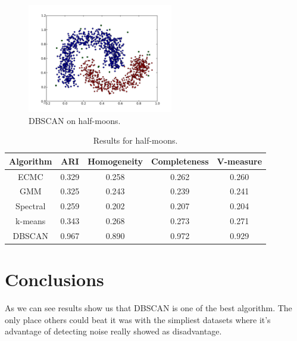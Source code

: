 \documentclass[conference]{IEEEtran}
\begin{document}
\begin{figure}[th]
\centering
\includegraphics[width=15pc]{dbscan_half-moons.pdf}
\caption{DBSCAN on half-moons.}
\label{DBSCAN_halfmoons}
\end{figure}

\begin{table}[htbp]
\caption{Results for half-moons.}
\label{halfmoonsresults}
\begin{center}
\setlength{\tabcolsep}{3pt}
\begin{tabular}{ |c|c|c|c|c| }
\hline
	Algorithm & ARI & Homogeneity & Completeness & V-measure\\ \hline
	
	ECMC & 0.329 & 0.258 & 0.262 & 0.260 \\ \hline
	GMM & 0.325 & 0.243 & 0.239 & 0.241 \\ \hline
	Spectral & 0.259 & 0.202 & 0.207 & 0.204 \\ \hline
	k-means & 0.343 & 0.268 & 0.273 & 0.271 \\ \hline
	DBSCAN & 0.967 & 0.890 & 0.972 & 0.929 \\ \hline
\end{tabular}
\end{center}
\end{table}


\section{Conclusions}

As we can see results show us that DBSCAN is one of the best algorithm. The only place others
could beat it was with the simpliest datasets where it's advantage of detecting noise really showed
as disadvantage.
\end{document}
